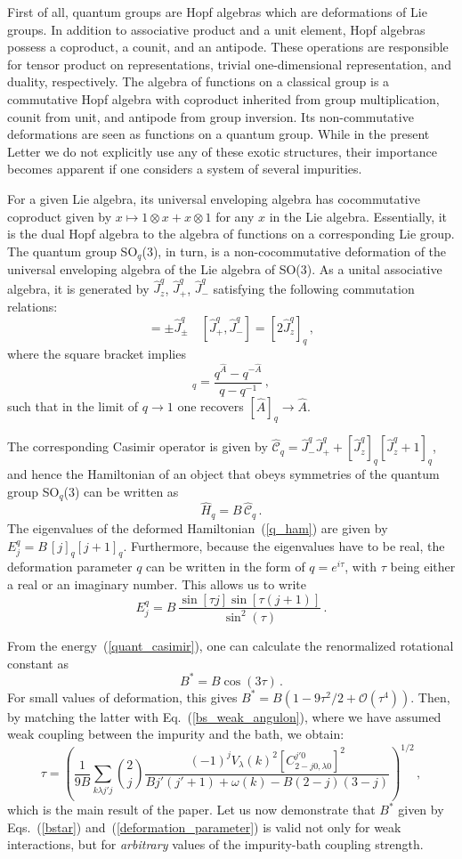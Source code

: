 \documentclass[aps,prl,reprint,showpacs,floatfix]{revtex4-1}
\def\be{\begin{equation}}
\def\ee{\end{equation}}
\begin{document}
First of all, quantum groups are Hopf algebras which are deformations of Lie groups. In addition to associative product and a unit element, Hopf algebras possess a coproduct, a counit, and an antipode. These operations are responsible for tensor product on representations, trivial one-dimensional representation, and duality,  respectively. The algebra of functions on a classical group is a commutative Hopf algebra with coproduct inherited from group multiplication, counit from unit, and antipode from group inversion. Its non-commutative deformations are seen as functions on a quantum group.  While in the present Letter we do not explicitly use any of these exotic structures, their importance becomes apparent if one considers a system of several impurities.

For a given Lie algebra, its universal enveloping algebra has cocommutative  coproduct given by $x\mapsto 1\otimes x+x\otimes 1$ for any $x$ in the Lie algebra. Essentially, it is the dual Hopf algebra to the algebra of functions on a corresponding Lie group. The quantum group SO$_q$(3), in turn, is a non-cocommutative deformation of the universal enveloping algebra of the Lie algebra of SO(3). As a unital associative algebra, it is generated by $\hat{J}_z^q$, $\hat{J}_{+}^q$, $\hat{J}_{-}^q$ satisfying the following commutation relations:
\be
[\hat{J}_z^q, \hat{J}_{\pm}^q] = \pm \hat{J}_{\pm}^q \quad [\hat{J}_{+}^q, \hat{J}_{-}^q] = [2\hat{J}_z^q]_q \, ,
\ee
where the square bracket implies 
\be
[\hat{A}]_q = \frac{q^{\hat{A}} - q^{-\hat{A}}}{q-q^{-1}} \, ,
\ee
such that in the limit of $q\to 1$ one recovers $[\hat{A}]_q \to \hat{A}$.


The corresponding Casimir operator is given by $ \mathcal{\hat{C}}_q = \hat{J}_{-}^q \hat{J}_{+}^q + [\hat{J}_z^q]_q [\hat{J}_z^q + 1]_q $, and hence the Hamiltonian of an object that obeys symmetries of the quantum group SO$_q$(3) can be written as \be
\label{q_ham}
\hat H_q = B \, \mathcal{\hat{C}}_q \, .
\ee
The eigenvalues of the deformed Hamiltonian~(\ref{q_ham}) are given by $ E_j^q = B \, [j]_q[j+1]_q $. Furthermore, because the eigenvalues have to be real, the deformation parameter $q$ can be written in the form of $q = e^{i \tau}$, with $\tau$ being either a real or an imaginary number. This allows us to write
\be
\label{quant_casimir}
E_j^q = B \, \frac{\sin[\tau j] \sin[\tau (j+1)]}{\sin^2 (\tau)} \, .
\ee

From the energy~(\ref{quant_casimir}), one can calculate the renormalized rotational constant as
\be
\label{bstar}
B^* = B \cos(3 \tau) \, .
\ee
For small values of deformation, this gives $B^* = B (1 - 9 \tau^2/2 + \mathcal{O}(\tau^4))$. Then, by matching the latter with Eq.~(\ref{bs_weak_angulon}), where we have assumed weak coupling between the impurity and the bath, we obtain:
\be
\label{deformation_parameter}
\tau = \left( \frac{1}{9 B} \sum_{k \lambda j' j}  \binom{2}{j} \frac{(-1)^{j} V_\lambda (k)^2 \left[ C_{2-j 0, \lambda 0}^{j' 0} \right]^2}{B j'(j'+1) + \omega(k) - B (2-j)(3-j)} \right)^{1/2} \, ,
\ee
which is the main result of the paper. Let us now demonstrate that $B^*$ given by Eqs.~(\ref{bstar}) and~(\ref{deformation_parameter}) is valid not only for weak interactions, but for \textit{arbitrary} values of the impurity-bath coupling strength. 
\end{document}
